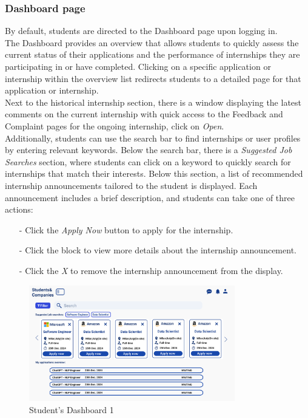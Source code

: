 \subsubsection{Dashboard page}
By default, students are directed to the Dashboard page upon logging in.\\ 
The Dashboard provides an overview that allows students to quickly assess 
the current status of their applications and the performance of internships they are participating in or have completed.
Clicking on a specific application or internship within the overview list redirects students to a detailed page for that application or internship.\\
Next to the historical internship section, there is a window displaying the latest comments on the current internship with quick access to 
the Feedback and Complaint pages for the ongoing internship, click on \textit{Open}.\\
Additionally, students can use the search bar to find internships or user profiles by entering relevant keywords. Below the search bar, there is a
 \textit{Suggested Job Searches} section, where students can click on a keyword to quickly search for internships that match their interests.
Below this section, a list of recommended internship announcements tailored to the student is displayed. Each announcement includes a brief description, 
and students can take one of three actions:
\begin{itemize}
    \item[-] Click the \textit{Apply Now} button to apply for the internship.
    \item[-] Click the block to view more details about the internship announcement.
    \item[-] Click the \textit{X} to remove the internship announcement from the display.
\end{itemize}
\begin{figure}[H]
    \centering
    \includegraphics[width=0.8\textwidth]{Images/UI/Dashboard 1-student.png}
    \caption{Student's Dashboard 1}\label{fig:DashboardStudent1}
\end{figure}

